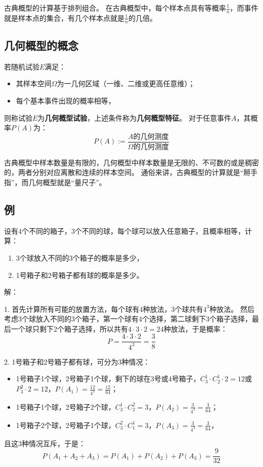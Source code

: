 古典概型的计算基于排列组合。
在古典概型中，每个样本点具有等概率$\frac{1}{n}$，而事件就是样本点的集合，有几个样本点就是$\frac{1}{n}$的几倍。

\subsection{几何概型的概念}

\begin{definition}[几何概型]
若随机试验$E$满足：
\begin{itemize}
    \item 其样本空间$\varOmega $为一几何区域（一维、二维或更高任意维）；
    \item 每个基本事件出现的概率相等，
\end{itemize}
则称试验$E$为{\bf 几何概型试验}，上述条件称为{\bf 几何概型特征}。
对于任意事件$A$，其概率$P\left( A \right) $为：
\[
P\left( A \right) :=\frac{A\text{的几何测度}}{\varOmega \text{的几何测度}}
\]
\end{definition}

古典概型中样本数量是有限的，几何概型中样本数量是无限的、不可数的或是稠密的，两者分别对应离散和连续的样本空间。
通俗来讲，古典概型的计算就是“掰手指”，而几何概型就是“量尺子”。

\subsection{例}

\begin{example}
设有4个不同的箱子，3个不同的球，每个球可以放入任意箱子，且概率相等，计算：
\begin{enumerate}
    \item 3个球放入不同的3个箱子的概率是多少，
    \item 1号箱子和2号箱子都有球的概率是多少。
\end{enumerate}
\end{example}

解：

1. 首先计算所有可能的放置方法，每个球有4种放法，3个球共有$4^3$种放法。
然后考虑3个球放入不同的3个箱子，第一个球有4个选择，第二球剩下3个箱子选择，最后一个球只剩下2个箱子选择，所以共有$4\cdot 3\cdot 2=24$种放法，于是概率：
\[
P=\frac{4\cdot 3\cdot 2}{4^3}=\frac{3}{8}
\]

2. 1号箱子和2号箱子都有球，可分为3种情况：
\begin{itemize}
    \item 1号箱子1个球，2号箱子1个球，剩下的球在3号或4号箱子，$C_{3}^{1}\cdot C_{2}^{1}\cdot 2=12$或$P_{3}^{2}\cdot 2=12$，$P\left( A_1 \right) =\frac{12}{4^3}=\frac{12}{64}$；
    \item 1号箱子1个球，2号箱子2个球，$C_{3}^{1}\cdot C_{2}^{2}=3$，$P\left( A_2 \right) =\frac{3}{4^3}=\frac{3}{64}$；
    \item 1号箱子2个球，2号箱子1个球，$C_{3}^{2}\cdot C_{1}^{1}=3$，$P\left( A_3 \right) =\frac{3}{4^3}=\frac{3}{64}$，
\end{itemize}
且这3种情况互斥，于是：
\[
P\left( A_1+A_2+A_3 \right) =P\left( A_1 \right) +P\left( A_2 \right) +P\left( A_3 \right) =\frac{9}{32}
\]

